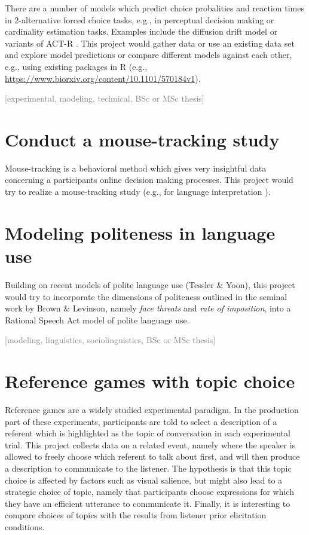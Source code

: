 \documentclass[fleqn,reqno,10pt]{article}
\newcommand{\scope}[1]{\hfill\textcolor{gray}{[#1]}}
\begin{document}
There are a number of models which predict choice probalities and reaction times in
2-alternative forced choice tasks, e.g., in perceptual decision making or cardinality
estimation tasks. Examples include the diffusion drift model
\citep[e.g.][]{RatcliffMcKoon2008:The-Diffusion-D} or variants of ACT-R
\citep{AndersonBothell2004:An-Integrated-T}. This project would gather data or use an existing
data set and explore model predictions or compare different models against each other, e.g.,
using existing packages in R (e.g., \url{https://www.biorxiv.org/content/10.1101/570184v1}).

\scope{experimental, modeling, technical, BSc or MSc thesis}

\section{Conduct a mouse-tracking study}

Mouse-tracking is a behavioral method which gives very insightful data concerning a
participants online decision making processes. This project would try to realize a
mouse-tracking study (e.g., for language interpretation  \citep{Jr.Bailey2013:Possibly-all-of,RoettgerStoeber2017:Manual-Response}).

\section{Modeling politeness in language use}

Building on recent models of polite language use (Tessler \& Yoon), this project would try to incorporate the dimensions of politeness outlined in the seminal work by Brown \& Levinson, namely \emph{face threats} and \emph{rate of imposition}, into a Rational Speech Act model of polite language use.

\scope{modeling, linguistics, sociolinguistics, BSc or MSc thesis}

\section{Reference games with topic choice}

Reference games are a widely studied experimental paradigm. In the production part of these experiments, participants are told to select a description of a referent which is highlighted as the topic of conversation in each experimental trial. This project collects data on a related event, namely where the speaker is allowed to freely choose which referent to talk about first, and will then produce a description to communicate to the listener. The hypothesis is that this topic choice is affected by factors such as visual salience, but might also lead to a strategic choice of topic, namely that participants choose expressions for which they have an efficient utterance to communicate it. Finally, it is interesting to compare choices of topics with the results from listener prior elicitation conditions.
\end{document}
